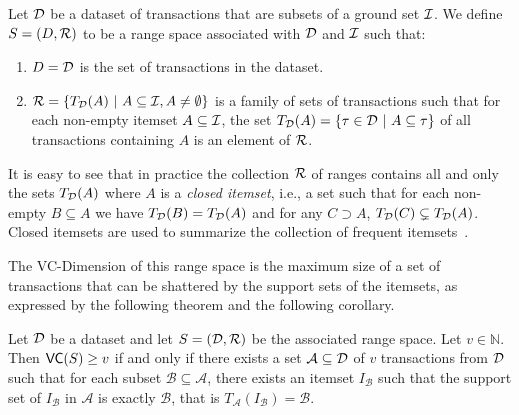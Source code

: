 \begin{definition}\label{def:vcrangespace}
  Let ${\cal D}$ be a dataset of transactions that are subsets of a ground set
  ${\cal I}$.  We define $S=(D,\mathcal{R})$ to be a range space associated with ${\cal D}$
  and ${\cal I}$ such that:
  \begin{enumerate}
    \item $D={\cal D}$ is the set of transactions in the dataset.
    \item $\mathcal{R}=\{T_{\cal D}(A) ~|~ A\subseteq {\cal I}, A\neq\emptyset\}$ is a family of
      sets of transactions such that for each non-empty itemset
      $A\subseteq{\cal I}$, the set $T_{\cal D}(A)=\{\tau\in{\cal D} ~|~ A\subseteq\tau\}$ of
      all transactions containing $A$ is an element of $\mathcal{R}$.
  \end{enumerate}
\end{definition}

It is easy to see that in practice the collection $\mathcal{R}$ of ranges contains all and only
the sets $T_{\cal D}(A)$ where $A$ is a \emph{closed itemset}, i.e., a set such that
for each non-empty $B\subseteq A$ we have $T_{\cal D}(B)=T_{\cal D}(A)$ and for any
$C\supset A$, $T_{\cal D}(C)\subsetneq T_{\cal D}(A)$. Closed itemsets are used to
summarize the collection of frequent itemsets~\citep{CaldersRB06}.

The VC-Dimension of this range space is the maximum size of a set of
transactions that can be shattered by the support sets of the itemsets, as
expressed by the following theorem and the following corollary.

\begin{theorem}
  Let ${\cal D}$ be a dataset and let $S=({\cal D},\mathcal{R})$ be the associated range
  space. Let $v\in\mathbb{N}$. Then $\mathsf{VC}(S)\ge v$ if and only if there exists a
  set $\mathcal{A}\subseteq{\cal D}$ of $v$ transactions from ${\cal D}$ such that for
  each subset $\mathcal{B}\subseteq\mathcal{A}$, there exists an itemset
  $I_\mathcal{B}$ such that the support set
  of $I_\mathcal{B}$ in $\mathcal{A}$ is exactly $\mathcal{B}$, that is
  $T_\mathcal{A}(I_\mathcal{B})=\mathcal{B}$.
\end{theorem}

